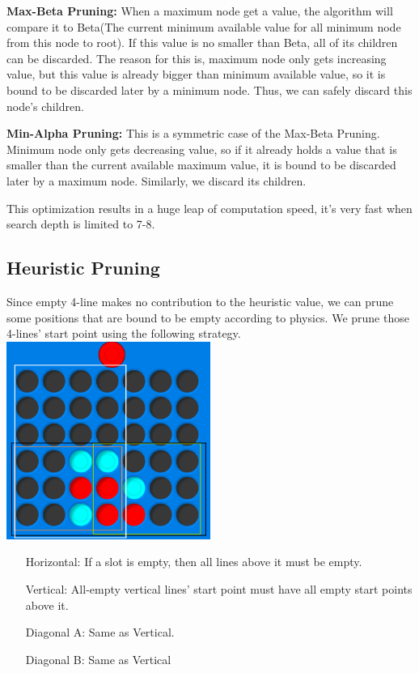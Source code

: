 \documentclass[12pt,a4paper]{article}
\begin{document}
	\textbf{Max-Beta Pruning:} When a maximum node get a value, the algorithm will compare it to Beta(The current minimum available value for all minimum node from this node to root). If this value is no smaller than Beta, all of its children can be discarded. The reason for this is, maximum node only gets increasing value, but this value is already bigger than minimum available value, so it is bound to be discarded later by a minimum node. Thus, we can safely discard this node's children.
	
	\textbf{Min-Alpha Pruning:} This is a symmetric case of the Max-Beta Pruning. Minimum node only gets decreasing value, so if it already holds a value that is smaller than the current available maximum value, it is bound to be discarded later by a maximum node. Similarly, we discard its children.
	
	This optimization results in a huge leap of computation speed, it's very fast when search depth is limited to 7-8.
	\subsection{Heuristic Pruning}
	Since empty 4-line makes no contribution to the heuristic value, we can prune some positions that are bound to be empty according to physics. We prune those 4-lines' start point using the following strategy.\\
	
	{\centering\includegraphics[width=0.5\textwidth]{LineField.png}~\\}
	
	\begin{enumerate}
		\item [Horizontal:] If a slot is empty, then all lines above it must be empty.
		\item [Vertical:] All-empty vertical lines' start point must have all empty start points above it.
		\item [Diagonal A:] Same as Vertical.
		\item [Diagonal B:] Same as Vertical
	\end{enumerate}
\end{document}
